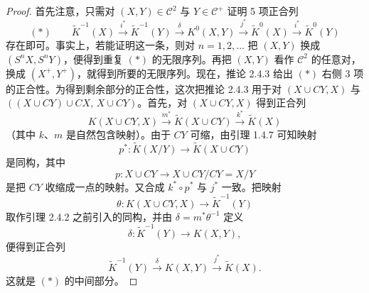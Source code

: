 \begin{proof}
  首先注意，只需对 $(X,Y)\in\mathcal{C}^2$ 与 $Y\in\mathcal{C}^+$ 证明 5 项正合列
  \[
  (*)\qquad \tilde K^{-1}(X)\xrightarrow{i^*}\tilde K^{-1}(Y)\xrightarrow{\ \delta\ }K^0(X,Y)
  \xrightarrow{j^*}\tilde K^0(X)\xrightarrow{i^*}\tilde K^0(Y)
  \]
  存在即可。事实上，若能证明这一条，则对 $n=1,2,\ldots$ 把 $(X,Y)$ 换成 $(S^nX,S^nY)$，便得到重复 $(*)$ 的无限序列。再把 $(X,Y)$ 看作 $\mathcal{C}^2$ 的任意对，换成 $(X^+,Y^+)$，就得到所要的无限序列。现在，推论 2.4.3 给出 $(*)$ 右侧 3 项的正合性。为得到剩余部分的正合性，这次把推论 2.4.3 用于对 $(X\cup CY,X)$ 与 $((X\cup CY)\cup CX,\,X\cup CY)$。首先，对 $(X\cup CY,X)$ 得到正合列
  \[
  K(X\cup CY,X)\xrightarrow{m^*}\tilde K(X\cup CY)\xrightarrow{k^*}\tilde K(X)
  \]
  （其中 $k$、$m$ 是自然包含映射）。由于 $CY$ 可缩，由引理 1.4.7 可知映射
  \[
  p^*\colon\tilde K(X/Y)\longrightarrow\tilde K(X\cup CY)
  \]
  是同构，其中
  \[
  p\colon X\cup CY\longrightarrow X\cup CY/CY=X/Y
  \]
  是把 $CY$ 收缩成一点的映射。又合成 $k^*\circ p^*$ 与 $j^*$ 一致。把映射
  \[
  \theta\colon K(X\cup CY,X)\longrightarrow\tilde K^{-1}(Y)
  \]
  取作引理 2.4.2 之前引入的同构，并由 $\delta=m^*\theta^{-1}$ 定义
  \[
  \delta\colon\tilde K^{-1}(Y)\longrightarrow K(X,Y),
  \]
  便得到正合列
  \[
  \tilde K^{-1}(Y)\xrightarrow{\ \delta\ }K(X,Y)\xrightarrow{j^*}\tilde K(X).
  \]
  这就是 $(*)$ 的中间部分。


\end{proof}
